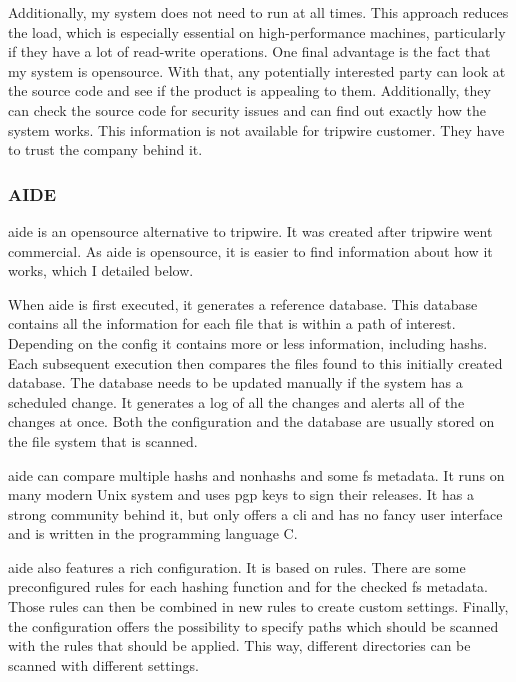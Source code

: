 Additionally, my system does not need to run at all times. This approach reduces the load, which is especially essential on high-performance machines, particularly if they have a lot of read-write operations. One final advantage is the fact that my system is \gls{opensource}. With that, any potentially interested party can look at the source code and see if the product is appealing to them. Additionally, they can check the source code for security issues and can find out exactly how the system works. This information is not available for \gls{tripwire} customer. They have to trust the company behind it.


\subsubsection{AIDE}
\label{sec:aide}

\Gls{aide} is an \gls{opensource} alternative to \gls{tripwire}. It was created after \gls{tripwire} went commercial. As \gls{aide} is \gls{opensource}, it is easier to find information about how it works, which I detailed below. \cite{aide:totherescue, aide:github}

When \gls{aide} is first executed, it generates a reference database. This database contains all the information for each file that is within a path of interest. Depending on the config it contains more or less information, including \glspl{hash}. Each subsequent execution then compares the files found to this initially created database. The database needs to be updated manually if the system has a scheduled change. It generates a log of all the changes and alerts all of the changes at once. Both the configuration and the database are usually stored on the file system that is scanned. \cite{aide, aide:doc}

\Gls{aide} can compare multiple \glspl{hash} and \glspl{nonhash} and some \gls{fs} \gls{metadata}. It runs on many modern Unix system \cite{aide} and uses \gls{pgp} keys to sign their releases. It has a strong community behind it, but only offers a \gls{cli} and has no fancy user interface and is written in the programming language C. \cite{aide:github} 

\Gls{aide} also features a rich configuration. It is based on rules. There are some preconfigured rules for each hashing function and for the checked \gls{fs} \gls{metadata}. Those rules can then be combined in new rules to create custom settings. Finally, the configuration offers the possibility to specify paths which should be scanned with the rules that should be applied. This way, different directories can be scanned with different settings. \cite{aide:conf}


